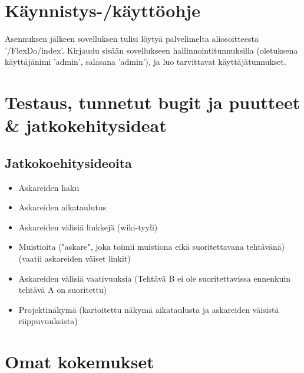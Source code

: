 ﻿\documentclass[finnish]{article}
\begin{document}
\section{Käynnistys-/käyttöohje}

Asennuksen jälkeen sovelluksen tulisi löytyä palvelimelta aliosoitteesta '/FlexDo/index'.
Kirjaudu sisään sovellukseen hallinnointitunnuksilla (oletuksena käyttäjänimi 'admin', salasana 'admin'), ja luo tarvittavat käyttäjätunnukset.


\section{Testaus, tunnetut bugit ja puutteet \& jatkokehitysideat}

\subsection{Jatkokoehitysideoita}

\begin{itemize}
  \item Askareiden haku
  \item Askareiden aikataulutus
  \item Askareiden välisiä linkkejä (wiki-tyyli)
  \item Muistioita ("askare", joka toimii muistiona eikä suoritettavana tehtävänä) (vaatii askareiden väiset linkit)
  \item Askareiden välisiä vaativuuksia (Tehtävä B ei ole suoritettavissa ennenkuin tehtävä A on suoritettu)
  \item Projektinäkymä (kartoitettu näkymä aikataulusta ja askareiden väisistä riippuvuuksista)
\end{itemize}


\section{Omat kokemukset}
\end{document}

